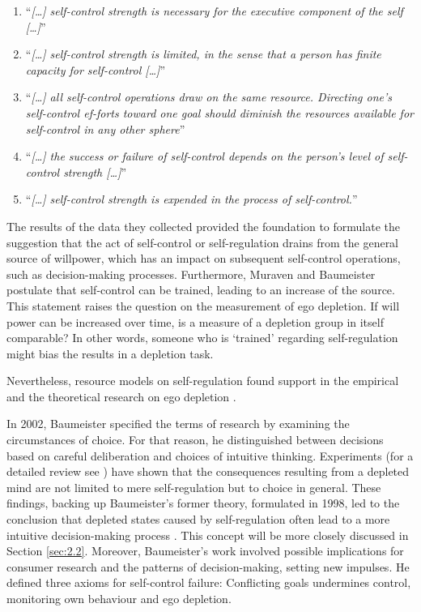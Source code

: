 \begin{enumerate}
\item “\emph{[\ldots] self-control strength is necessary for the executive component of the self [\ldots]}” \citep[p.~248]{muraven2000self}
\item “\emph{[\ldots] self-control strength is limited, in the sense that a person has finite capacity for self-control [\ldots]}” \citep[p.~248]{muraven2000self}
\item “\emph{[\ldots] all self-control operations draw on the same resource. Directing one's self-control ef-forts toward one goal should diminish the resources available for self-control in any other sphere}” \citep[p.~248]{muraven2000self}
\item “\emph{[\ldots] the success or failure of self-control depends on the person's level of self-control strength [\ldots]}” \citep[p.~248]{muraven2000self}
\item “\emph{[\ldots] self-control strength is expended in the process of self-control.}” \citep[p.~248]{muraven2000self}
\end{enumerate}
The results of the data they collected provided the foundation to formulate the suggestion that the act of self-control or self-regulation drains from the general source of willpower, which has an impact on subsequent self-control operations, such as decision-making processes. Furthermore, Muraven and Baumeister postulate that self-control can be trained, leading to an increase of the source. This statement raises the question on the measurement of ego depletion. If will power can be increased over time, is a measure of a depletion group in itself comparable? In other words, someone who is ‘trained’ regarding self-regulation might bias the results in a depletion task.\par
Nevertheless, resource models on self-regulation found support in the empirical and the theoretical research on ego depletion \citep{mischel1996good,gross1998emerging,vohs2000self} .\par
In 2002, Baumeister \citep{baumeister2002yielding}  specified the terms of research by examining the circumstances of choice. For that reason, he distinguished between decisions based on careful deliberation and choices of intuitive thinking. Experiments (for a detailed review see \cite{vohs2000self}) have shown that the consequences resulting from a depleted mind are not limited to mere self-regulation but to choice in general. These findings, backing up Baumeister’s former theory, formulated in 1998, led to the conclusion that depleted states caused by self-regulation often lead to a more intuitive decision-making process \citep{pocheptsova2009deciding}. This concept will be more closely discussed in Section \ref{sec:2.2}. Moreover, Baumeister’s work involved possible implications for consumer research and the patterns of decision-making, setting new impulses. He defined three axioms for self-control failure: Conflicting goals undermines control, monitoring own behaviour and ego depletion. \par
